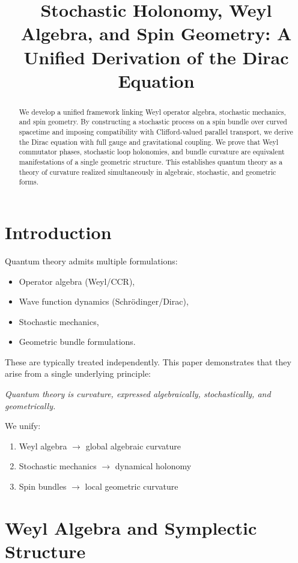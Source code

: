\documentclass[11pt]{article}
\title{\textbf{Stochastic Holonomy, Weyl Algebra, and Spin Geometry:
A Unified Derivation of the Dirac Equation}}
\author{}
\date{}
\begin{document}
\maketitle
\begin{abstract}
We develop a unified framework linking Weyl operator algebra, stochastic
    mechanics, and spin geometry. By constructing a stochastic process on
    a spin bundle over curved spacetime and imposing compatibility with
    Clifford-valued parallel transport, we derive the Dirac equation with
    full gauge and gravitational coupling. We prove that Weyl commutator
    phases, stochastic loop holonomies, and bundle curvature are equivalent
    manifestations of a single geometric structure. This establishes
    quantum theory as a theory of curvature realized simultaneously in 
    algebraic, stochastic, and geometric forms.
\end{abstract}
\tableofcontents
\section{Introduction}
Quantum theory admits multiple formulations:
\begin{itemize}
\item Operator algebra (Weyl/CCR),
\item Wave function dynamics (Schr\"odinger/Dirac),
\item Stochastic mechanics,
\item Geometric bundle formulations.
\end{itemize}

These are typically treated independently. This paper demonstrates that
they arise from a single underlying principle:

\begin{center}
\emph{Quantum theory is curvature, expressed algebraically, stochastically,
    and geometrically.}
\end{center}

We unify:
\begin{enumerate}
\item Weyl algebra $\rightarrow$ global algebraic curvature
\item Stochastic mechanics $\rightarrow$ dynamical holonomy
\item Spin bundles $\rightarrow$ local geometric curvature
\end{enumerate}

\section{Weyl Algebra and Symplectic Structure}
\end{document}
